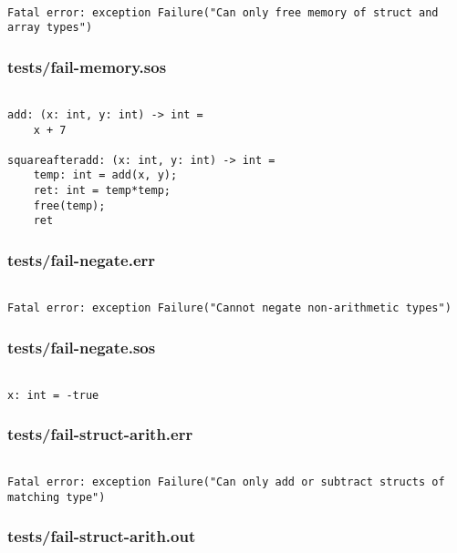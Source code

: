 \documentclass[main.tex]{subfiles}
\begin{document}
\begin{lstlisting}

Fatal error: exception Failure("Can only free memory of struct and array types")
\end{lstlisting}

\subsubsection{tests/fail-memory.sos}

\begin{lstlisting}

add: (x: int, y: int) -> int = 
    x + 7

squareafteradd: (x: int, y: int) -> int =
    temp: int = add(x, y);
    ret: int = temp*temp;
    free(temp);
    ret
\end{lstlisting}

\subsubsection{tests/fail-negate.err}

\begin{lstlisting}

Fatal error: exception Failure("Cannot negate non-arithmetic types")
\end{lstlisting}

\subsubsection{tests/fail-negate.sos}

\begin{lstlisting}

x: int = -true
\end{lstlisting}

\subsubsection{tests/fail-struct-arith.err}

\begin{lstlisting}

Fatal error: exception Failure("Can only add or subtract structs of matching type")
\end{lstlisting}

\subsubsection{tests/fail-struct-arith.out}
\end{document}

